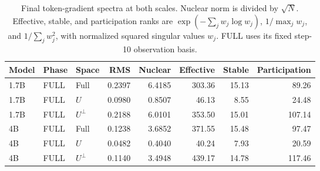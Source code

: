 \begin{table}[!htbp]
\centering
\caption{Final token-gradient spectra at both scales. Nuclear norm is divided by $\sqrt N$. Effective, stable, and participation ranks are $\exp(-\sum_jw_j\log w_j)$, $1/\max_jw_j$, and $1/\sum_jw_j^2$, with normalized squared singular values $w_j$. FULL uses its fixed step-10 observation basis.}
\label{tab:two_scale_ranks}
\small
\setlength{\tabcolsep}{3pt}
\begin{tabular}{lllrrrrr}
\toprule
Model & Phase & Space & RMS & Nuclear & Effective & Stable & Participation \\
\midrule
1.7B & FULL & Full & 0.2397 & 6.4185 & 303.36 & 15.13 & 89.26 \\
1.7B & FULL & $U$ & 0.0980 & 0.8507 & 46.13 & 8.55 & 24.48 \\
1.7B & FULL & $U^\perp$ & 0.2188 & 6.0101 & 353.50 & 15.01 & 107.14 \\
4B & FULL & Full & 0.1238 & 3.6852 & 371.55 & 15.48 & 97.47 \\
4B & FULL & $U$ & 0.0482 & 0.4040 & 40.24 & 7.93 & 20.59 \\
4B & FULL & $U^\perp$ & 0.1140 & 3.4948 & 439.17 & 14.78 & 117.46 \\
\bottomrule
\end{tabular}
\end{table}
